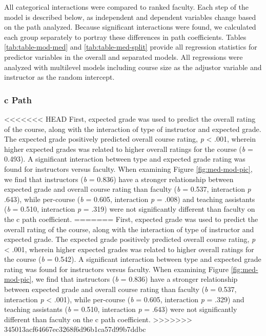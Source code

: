 \documentclass[man]{apa6}
\theoremstyle{definition}
\theoremstyle{definition}
\theoremstyle{definition}
\theoremstyle{remark}
\begin{document}
All categorical interactions were compared to ranked faculty. Each step of the model is described below, as independent and dependent variables change based on the path analyzed. Because significant interactions were found, we calculated each group separately to portray these differences in path coefficients. Tables \ref{tab:table-mod-med} and \ref{tab:table-med-split} provide all regression statistics for predictor variables in the overall and separated models. All regressions were analyzed with multilevel models including course size as the adjustor variable and instructor as the random intercept.

\subsubsection{c Path}\label{c-path}

<<<<<<< HEAD
First, expected grade was used to predict the overall rating of the
course, along with the interaction of type of instructor and expected
grade. The expected grade positively predicted overall course rating,
\emph{p} \textless{} .001, wherein higher expected grades was related to
higher overall ratings for the course (\emph{b} = 0.493). A significant
interaction between type and expected grade rating was found for
instructors versus faculty. When examining Figure \ref{fig:med-mod-pic},
we find that instructors (\emph{b} = 0.836) have a stronger relationship
between expected grade and overall course rating than faculty (\emph{b}
= 0.537, interaction \emph{p} .643), while per-course (\emph{b} = 0.605,
interaction \emph{p} = .008) and teaching assistants (\emph{b} = 0.510,
interaction \emph{p} = .319) were not significantly different than
faculty on the c path coefficient.
=======
First, expected grade was used to predict the overall rating of the course, along with the interaction of type of instructor and expected grade. The expected grade positively predicted overall course rating, \emph{p} \textless{} .001, wherein higher expected grades was related to higher overall ratings for the course (\emph{b} = 0.542). A significant interaction between type and expected grade rating was found for instructors versus faculty. When examining Figure \ref{fig:med-mod-pic}, we find that instructors (\emph{b} = 0.836) have a stronger relationship between expected grade and overall course rating than faculty (\emph{b} = 0.537, interaction \emph{p} \textless{} .001), while per-course (\emph{b} = 0.605, interaction \emph{p} = .329) and teaching assistants (\emph{b} = 0.510, interaction \emph{p} = .643) were not significantly different than faculty on the c path coefficient.
>>>>>>> 345013acf64667ec3268f6d96b1ca57d99b7ddbc
\end{document}
